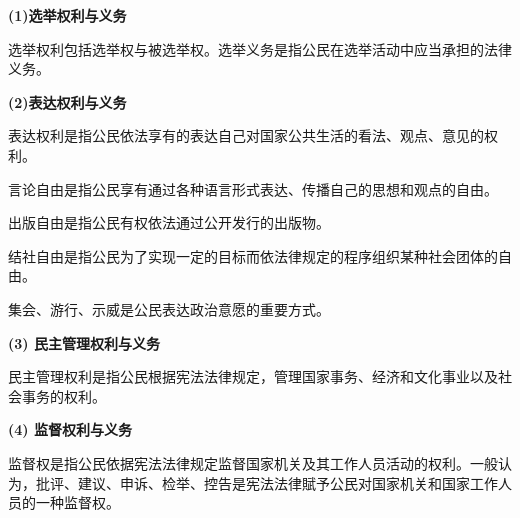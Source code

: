\textbf{{(1)选举权利与义务~}}

{选举权利包括}{选举权与被选举权}{。}{选举义务是指公民在选举活动中应当承担的法律义务。}

\textbf{{(2)表达权利与义务~}}

{表达权利是指公民依法享有的表达自己对国家公共生活的看法、观点、意见的权利}{。}

{言论自由}{是指公民享有通过各种语言形式表达、传播自己的思想和观点的自由。}{}

{出版自由}{是指公民有权依法通过公开发行的出版物。}

{结社自由}{是指公民为了实现一定的目标而依法律规定的程序组织某种社会团体的自由。}

{集会、游行、示威是公民表达政治意愿的重要方式}{。}{}

{\textbf{{(3) 民主管理权利与义务}{}}\\
}

{民主管理权利是指公民根据宪法法律规定，管理国家事务、经济和文化事业以及社会事务的权利。}

{{\textbf{(4) 监督权利与义务}}{\textbf{}}\\
}

{监督权是指公民依据宪法法律规定监督国家机关及其工作人员活动的权利。一般认为，批评、建议、申诉、检举、控告是宪法法律賦予公民对国家机关和国家工作人员的一种监督权。\\
}
